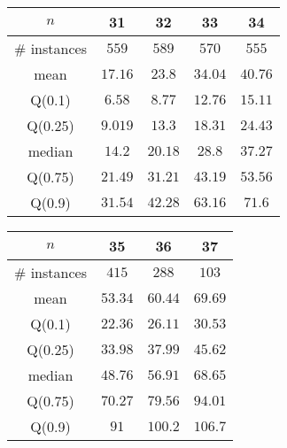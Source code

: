 \begin{tabular}{c|cccc} 
\hline 
$n$ & 31 & 32 & 33 & 34 \tabularnewline 
\hline 
\hline 
\# instances & $559$ & $589$ & $570$ & $555$ \tabularnewline 
mean & $17.16$ & $23.8$ & $34.04$ & $40.76$ \tabularnewline 
Q(0.1) & $6.58$ & $8.77$ & $12.76$ & $15.11$ \tabularnewline 
Q(0.25) & $9.019$ & $13.3$ & $18.31$ & $24.43$ \tabularnewline 
median & $14.2$ & $20.18$ & $28.8$ & $37.27$ \tabularnewline 
Q(0.75) & $21.49$ & $31.21$ & $43.19$ & $53.56$ \tabularnewline 
Q(0.9) & $31.54$ & $42.28$ & $63.16$ & $71.6$ \tabularnewline 
\hline 
\end{tabular} 
\medskip{} 

\begin{tabular}{c|ccc} 
\hline 
$n$ & 35 & 36 & 37 \tabularnewline 
\hline 
\hline 
\# instances & $415$ & $288$ & $103$ \tabularnewline 
mean & $53.34$ & $60.44$ & $69.69$ \tabularnewline 
Q(0.1) & $22.36$ & $26.11$ & $30.53$ \tabularnewline 
Q(0.25) & $33.98$ & $37.99$ & $45.62$ \tabularnewline 
median & $48.76$ & $56.91$ & $68.65$ \tabularnewline 
Q(0.75) & $70.27$ & $79.56$ & $94.01$ \tabularnewline 
Q(0.9) & $91$ & $100.2$ & $106.7$ \tabularnewline 
\hline 
\end{tabular} 
\medskip{} 

